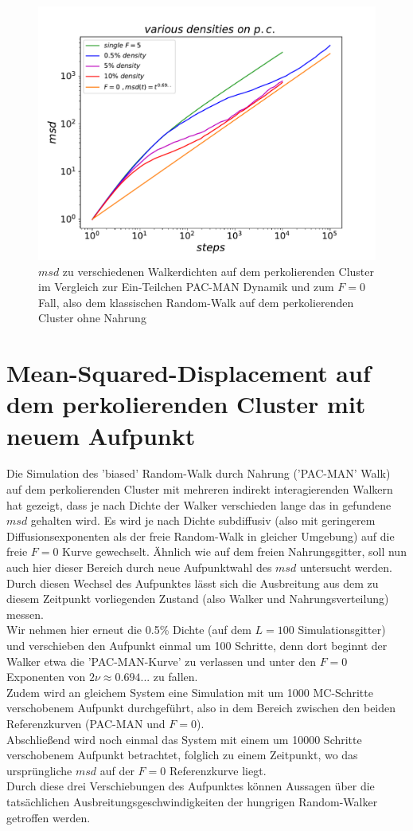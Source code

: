 \documentclass[a4paper, 12pt]{report}
\begin{document}
\begin{figure}[H]
	\centering
	\includegraphics[scale=0.75
	]{vardenspc.pdf}
	\caption{$msd$ zu verschiedenen Walkerdichten auf dem perkolierenden Cluster im Vergleich zur Ein-Teilchen PAC-MAN Dynamik und zum $F=0$ Fall, also dem klassischen Random-Walk auf dem perkolierenden Cluster ohne Nahrung}
\end{figure}

\section{Mean-Squared-Displacement auf dem perkolierenden Cluster mit neuem Aufpunkt}
Die Simulation des 'biased' Random-Walk durch Nahrung ('PAC-MAN' Walk) auf dem perkolierenden Cluster mit mehreren indirekt interagierenden Walkern hat gezeigt, dass je nach Dichte der Walker verschieden lange das in \cite{doi:10.1063/1.4999485} gefundene $msd$ gehalten wird. Es wird je nach Dichte subdiffusiv (also mit geringerem Diffusionsexponenten als der freie Random-Walk in gleicher Umgebung) auf die freie $F=0$ Kurve gewechselt. Ähnlich wie auf dem freien Nahrungsgitter, soll nun auch hier dieser Bereich durch neue Aufpunktwahl des $msd$ untersucht werden. Durch diesen Wechsel des Aufpunktes lässt sich die Ausbreitung aus dem zu diesem Zeitpunkt vorliegenden Zustand (also Walker und Nahrungsverteilung) messen.
\\
Wir nehmen hier erneut die 0.5\% Dichte (auf dem $L=100$ Simulationsgitter) und verschieben den Aufpunkt einmal um 100 Schritte, denn dort beginnt der Walker etwa die 'PAC-MAN-Kurve' zu verlassen und unter den $F=0$ Exponenten von $2\nu \approx 0.694...$ zu fallen.
\\
Zudem wird an gleichem System eine Simulation mit um 1000 MC-Schritte verschobenem Aufpunkt durchgeführt, also in dem Bereich zwischen den beiden Referenzkurven (PAC-MAN und $F=0$).
\\
Abschließend wird noch einmal das System mit einem um 10000 Schritte verschobenem Aufpunkt betrachtet, folglich zu einem Zeitpunkt, wo das ursprüngliche $msd$ auf der $F=0$ Referenzkurve liegt.
\\
Durch diese drei Verschiebungen des Aufpunktes können Aussagen über die tatsächlichen Ausbreitungsgeschwindigkeiten der hungrigen Random-Walker getroffen werden.
\end{document}
